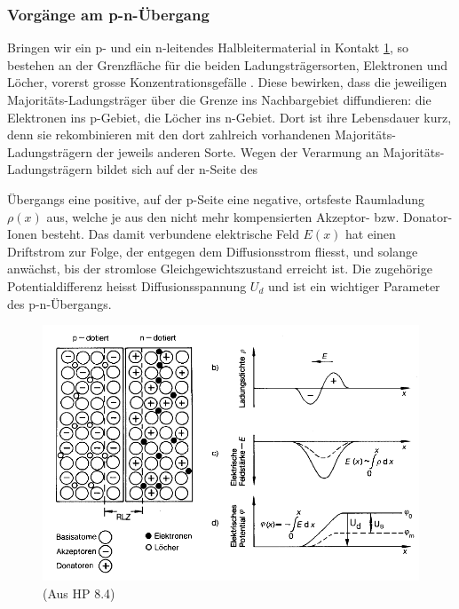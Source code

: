 \subsubsection{Vorg\"ange am p-n-\"Ubergang}

Bringen  wir  ein  p-   und  ein  n-leitendes  Halbleitermaterial  in  Kontakt
\ref{fig:pn},   so   bestehen   an   der   Grenzfl\"ache   f\"ur   die  beiden
Ladungstr\"agersorten,    Elektronen     und    L\"ocher,    vorerst    grosse
Konzentrationsgef\"alle   .    Diese    bewirken,    dass    die    jeweiligen
Majorit\"ats-Ladungstr\"ager \"uber die Grenze ins Nachbargebiet diffundieren:
die  Elektronen  ins  p-Gebiet,  die  L\"ocher  ins  n-Gebiet. Dort  ist  ihre
Lebensdauer kurz, denn sie rekombinieren mit den  dort  zahlreich  vorhandenen
Majorit\"ats- Ladungstr\"agern der jeweils  anderen Sorte. Wegen der Verarmung
an   Majorit\"ats-Ladungstr\"agern   bildet   sich   auf   der   n-Seite   des

\"Ubergangs eine positive, auf der p-Seite eine negative, ortsfeste Raumladung
$\rho(x)$  aus,  welche  je  aus den nicht mehr kompensierten  Akzeptor-  bzw.
Donator-Ionen besteht. Das damit verbundene elektrische Feld  $E(x)$ hat einen
Driftstrom zur Folge, der entgegen dem Diffusionsstrom  fliesst,  und  solange
anw\"achst,   bis   der  stromlose  Gleichgewichtszustand  erreicht  ist.  Die
zugeh\"orige Potentialdifferenz  heisst  Diffusionsspannung  $U_d$ und ist ein
wichtiger Parameter des p-n-\"Ubergangs.

\begin{figure}[H]
    \centering
    \includegraphics[width=.8\linewidth]{images/pn}
    \caption{(Aus HP 8.4)}
    \label{fig:pn}
\end{figure}

